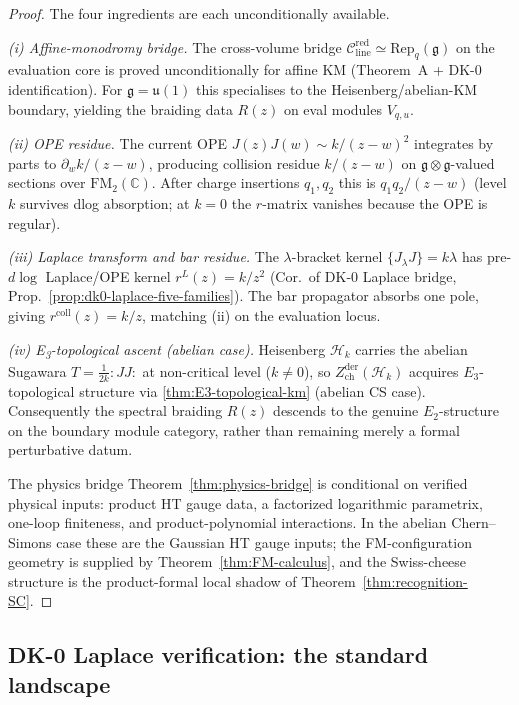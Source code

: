 \begin{proof}
The four ingredients are each unconditionally available.

\emph{(i) Affine-monodromy bridge.} The cross-volume bridge $\mathcal{C}_{\mathrm{line}}^{\mathrm{red}}\simeq\mathrm{Rep}_q(\mathfrak{g})$ on the evaluation core is proved unconditionally for affine KM (Theorem~A + DK-$0$ identification). For $\mathfrak{g}=\mathfrak{u}(1)$ this specialises to the Heisenberg/abelian-KM boundary, yielding the braiding data $R(z)$ on eval modules $V_{q,u}$.

\emph{(ii) OPE residue.} The current OPE $J(z)J(w)\sim k/(z-w)^2$ integrates by parts to $\partial_w k/(z-w)$, producing collision residue $k/(z-w)$ on $\mathfrak{g}\otimes\mathfrak{g}$-valued sections over $\mathrm{FM}_2(\mathbb{C})$. After charge insertions $q_1,q_2$ this is $q_1q_2/(z-w)$ (level $k$ survives dlog absorption; at $k=0$ the $r$-matrix vanishes because the OPE is regular).

\emph{(iii) Laplace transform and bar residue.} The $\lambda$-bracket kernel $\{J_\lambda J\}=k\lambda$ has pre-\textup{\(d\log\)} Laplace/OPE kernel $r^L(z)=k/z^2$ (Cor.\ of DK-$0$ Laplace bridge, Prop.~\ref{prop:dk0-laplace-five-families}). The bar propagator absorbs one pole, giving $r^{\mathrm{coll}}(z)=k/z$, matching (ii) on the evaluation locus.

\emph{(iv) E\textsubscript{3}-topological ascent (abelian case).} Heisenberg $\mathcal{H}_k$ carries the abelian Sugawara $T=\tfrac{1}{2k}{:}JJ{:}$ at non-critical level ($k\neq 0$), so $Z^{\mathrm{der}}_{\mathrm{ch}}(\mathcal{H}_k)$ acquires $E_3$-topological structure via \ref{thm:E3-topological-km} (abelian CS case). Consequently the spectral braiding $R(z)$ descends to the genuine $E_2$-structure on the boundary module category, rather than remaining merely a formal perturbative datum.

The physics bridge Theorem~\ref{thm:physics-bridge} is conditional
on verified physical inputs: product HT gauge data, a factorized
logarithmic parametrix, one-loop finiteness, and product-polynomial
interactions. In the abelian Chern--Simons case these are the
Gaussian HT gauge inputs; the FM-configuration geometry is supplied
by Theorem~\ref{thm:FM-calculus}, and the Swiss-cheese structure is
the product-formal local shadow of Theorem~\ref{thm:recognition-SC}.
\end{proof}

\subsection{DK-0 Laplace verification: the standard landscape}
\label{sec:DK-0}

